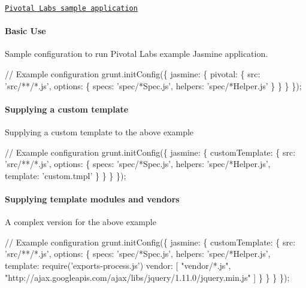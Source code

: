 \begin{DoxyItemize}
\item \href{https://github.com/jsoverson/grunt-contrib-jasmine-example}{\tt Pivotal Labs\textquotesingle{} sample application}
\end{DoxyItemize}

\paragraph*{Basic Use}

Sample configuration to run Pivotal Labs\textquotesingle{} example Jasmine application.


\begin{DoxyCode}
\textcolor{comment}{// Example configuration}
grunt.initConfig(\{
  jasmine: \{
    pivotal: \{
      src: \textcolor{stringliteral}{'src/**/*.js'},
      options: \{
        specs: \textcolor{stringliteral}{'spec/*Spec.js'},
        helpers: \textcolor{stringliteral}{'spec/*Helper.js'}
      \}
    \}
  \}
\});
\end{DoxyCode}


\paragraph*{Supplying a custom template}

Supplying a custom template to the above example


\begin{DoxyCode}
\textcolor{comment}{// Example configuration}
grunt.initConfig(\{
  jasmine: \{
    customTemplate: \{
      src: \textcolor{stringliteral}{'src/**/*.js'},
      options: \{
        specs: \textcolor{stringliteral}{'spec/*Spec.js'},
        helpers: \textcolor{stringliteral}{'spec/*Helper.js'},
        \textcolor{keyword}{template}: \textcolor{stringliteral}{'custom.tmpl'}
      \}
    \}
  \}
\});
\end{DoxyCode}


\paragraph*{Supplying template modules and vendors}

A complex version for the above example


\begin{DoxyCode}
\textcolor{comment}{// Example configuration}
grunt.initConfig(\{
  jasmine: \{
    customTemplate: \{
      src: \textcolor{stringliteral}{'src/**/*.js'},
      options: \{
        specs: \textcolor{stringliteral}{'spec/*Spec.js'},
        helpers: \textcolor{stringliteral}{'spec/*Helper.js'},
        \textcolor{keyword}{template}: require(\textcolor{stringliteral}{'exports-process.js'})
        vendor: [
          "vendor\textcolor{comment}{/*.js",}
\textcolor{comment}{          "http://ajax.googleapis.com/ajax/libs/jquery/1.11.0/jquery.min.js"}
\textcolor{comment}{        ]}
\textcolor{comment}{      \}}
\textcolor{comment}{    \}}
\textcolor{comment}{  \}}
\textcolor{comment}{\});}
\end{DoxyCode}



